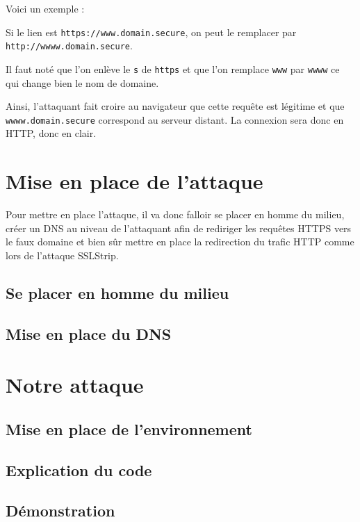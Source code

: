 Voici un exemple :

Si le lien est \verb+https://www.domain.secure+, on peut le remplacer par \verb+http://wwww.domain.secure+.

Il faut noté que l'on enlève le \verb+s+ de \verb+https+ et que l'on remplace \verb+www+ par \verb+wwww+ ce qui change bien le nom de domaine.

Ainsi, l'attaquant fait croire au navigateur que cette requête est légitime et que \verb+wwww.domain.secure+ correspond au serveur distant. La connexion sera donc en HTTP, donc en clair.

\section{Mise en place de l'attaque}
Pour mettre en place l'attaque, il va donc falloir se placer en homme du milieu, créer un DNS au niveau de l'attaquant afin de rediriger les requêtes HTTPS vers le faux domaine et bien sûr mettre en place la redirection du trafic HTTP comme lors de l'attaque SSLStrip.

\subsection{Se placer en homme du milieu}

\subsection{Mise en place du DNS}


\section{Notre attaque}

\subsection{Mise en place de l'environnement}

\subsection{Explication du code}

\subsection{Démonstration}
